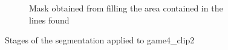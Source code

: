 \begin{figure}
\begin{subfigure}[b]{0.75\textwidth}
        \caption{Mask obtained from filling the area contained in the lines found}
        \label{fig:finalsegtabol}
    \end{subfigure}
    \caption{Stages of the segmentation applied to game4\_clip2}
    \vspace{30pt}
\end{figure}
